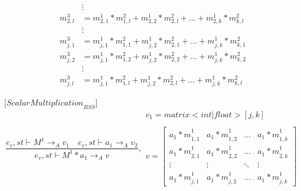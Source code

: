\begin{minipage}{1.0\textwidth}
\begin{equation*}
\begin{aligned}
&\vdots\\
{ { m }_{ 2,l }^{ 3 } }  &= { { m }_{ 2,1 }^{ 1 } } *{ { m }_{ 1,l }^{ 2 } }+ { { m }_{ 2,2 }^{ 1 } } *{ { m }_{ 2,l }^{ 2 } }+\dots+ { { m }_{ 2,k }^{ 1 } } *{ { m }_{ k,l }^{ 2 } }\\
&\vdots\\
{ { m }_{ j,1 }^{ 3 } }  &= { { m }_{ j,1 }^{ 1 } } *{ { m }_{ 1,1 }^{ 2 } }+ { { m }_{ j,2 }^{ 1 } } *{ { m }_{ 2,1 }^{ 2 } }+\dots+ { { m }_{ j,k }^{ 1 } } *{ { m }_{ k,1 }^{ 2 } }\\
{ { m }_{ j,2 }^{ 3 } }  &= { { m }_{ j,1 }^{ 1 } } *{ { m }_{ 1,2 }^{ 2 } }+ { { m }_{ j,2 }^{ 1 } } *{ { m }_{ 2,2 }^{ 2 } }+\dots+ { { m }_{ j,k }^{ 1 } } *{ { m }_{ k,2 }^{ 2 } }\\
&\vdots\\
{ { m }_{ j,l }^{ 3 } }  &= { { m }_{ j,1 }^{ 1 } } *{ { m }_{ 1,l }^{ 2 } }+ { { m }_{ j,2 }^{ 1 } } *{ { m }_{ 2,l }^{ 2 } }+\dots+ { { m }_{ j,k }^{ 1 } } *{ { m }_{ k,l }^{ 2 } }
\end{aligned}
\end{equation*}
\end{minipage}

[${ScalarMultiplication}_{BSS}$]
\begin{equation}
	\frac { { e }_{ v },st\vdash { M }^{ 1 }{ \rightarrow  }_{ A }{ v }_{ 1 }\quad { e }_{ v },st\vdash { a }_{ 1 }{ \rightarrow  }_{ A }{ v }_{ 2 } }{ { e }_{ v },st\vdash { M }^{ 1 }\ast { a }_{ 1 }{ \rightarrow  }_{ A }{ v } } ,\begin{matrix} { v }_{ 1 }=matrix<int|float>[j,k] \\  \\ v=\begin{bmatrix} { { a }_{ 1 }*m }_{ 1,1 }^{ 1 } & { { a }_{ 1 }*m }_{ 1,2 }^{ 1 } & \dots  & { { a }_{ 1 }*m }_{ 1,k }^{ 1 } \\ { { a }_{ 1 }*m }_{ 2,1 }^{ 1 } & { { a }_{ 1 }*m }_{ 2,2 }^{ 1 } & \dots  & { { a }_{ 1 }*m }_{ 2,k }^{ 1 } \\ \vdots  & \vdots  & \ddots  & \vdots  \\ { { a }_{ 1 }*m }_{ j,1 }^{ 1 } & { { a }_{ 1 }*m }_{ j,2 }^{ 1 } & \dots  & { { a }_{ 1 }*m }_{ j,k }^{ 1 } \end{bmatrix} \end{matrix}
\end{equation}

